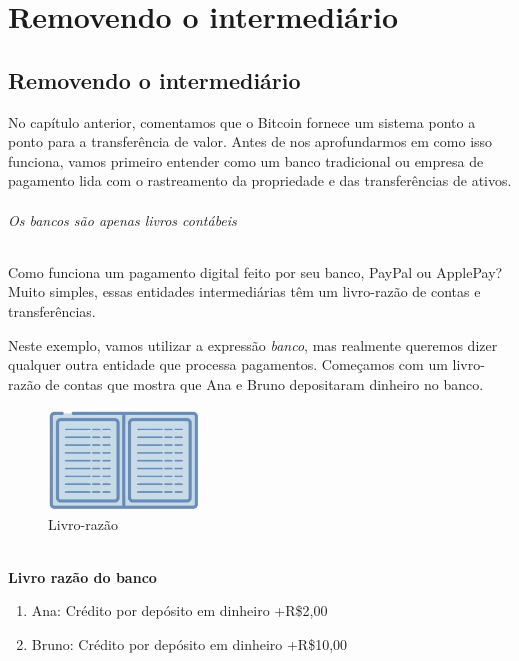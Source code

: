 \part{Removendo o intermediário}
\label{ch:capitulo2}
\chapter*{Removendo o intermediário}

No capítulo anterior, comentamos que o Bitcoin fornece um sistema ponto a ponto para a transferência de valor. Antes de nos aprofundarmos em como isso funciona, vamos primeiro entender como um banco tradicional ou empresa de pagamento lida com o rastreamento da propriedade e das transferências de ativos.

\paragraph{Os bancos são apenas livros contábeis}
\paragraph{}

Como funciona um pagamento digital feito por seu banco, PayPal ou ApplePay? Muito simples, essas entidades intermediárias têm um livro-razão de contas e transferências.

Neste exemplo, vamos utilizar a expressão \textit{banco}, mas realmente queremos dizer qualquer outra entidade que processa pagamentos. Começamos com um livro-razão de contas que mostra que Ana e Bruno depositaram dinheiro no banco.

\newpage
\begin{figure}
  \centering
  \includegraphics[width=4cm]{imagens/livro-capitulo-02.jpg}  
  \caption{Livro-razão}
\end{figure}

\paragraph{}
\textbf{Livro razão do banco}

\begin{samepage}
\begin{enumerate}
\item Ana: Crédito por depósito em dinheiro +R\$2,00
\item Bruno: Crédito por depósito em dinheiro +R\$10,00
\end{enumerate}
\end{samepage}

